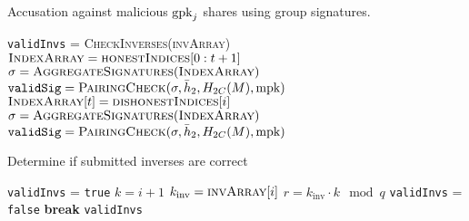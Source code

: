 \begin{algorithm}[p]
\caption{Accusation against malicious $\textrm{gpk}_{j}$ shares using
    group signatures.}
\label{alg:grpsig_malicious}
\begin{algorithmic}[1]
        \State \Return
    \EndIf
    \State \texttt{validInvs} = \textsc{CheckInverses}(\textsc{invArray})
        \State \Return
    \EndIf
    \State $\textsc{IndexArray} = \textsc{honestIndices}[0:t+1]$
    \State $\sigma = \textsc{AggregateSignatures}(\textsc{IndexArray})$
    \State $\texttt{validSig} = \textsc{PairingCheck}(\sigma, \bar{h}_{2},
        H_{2C}(M), \text{mpk})$
        \State \Return
    \EndIf
        \State $\textsc{IndexArray}[t]
            = \textsc{dishonestIndices}[i]$
        \State $\sigma = \textsc{AggregateSignatures}(\textsc{IndexArray})$
        \State $\texttt{validSig} = \textsc{PairingCheck}(\sigma, \bar{h}_{2},
            H_{2C}(M), \text{mpk})$
            \State \Return
        \EndIf
    \EndFor
\EndFunction
\end{algorithmic}
\end{algorithm}

\begin{algorithm}[p]
\caption{Determine if submitted inverses are correct}
\label{alg:grpsig_mal_Rj}
\begin{algorithmic}[1]
    \State \texttt{validInvs} = \texttt{true}
        \State $k = i+1$
        \State $k_{\text{inv}} = \textsc{invArray}[i]$
        \State $r = k_{\text{inv}}\cdot k \mod q$
            \State \texttt{validInvs} = \texttt{false}
            \State \textbf{break}
        \EndIf
    \EndFor
    \State \Return \texttt{validInvs}
\EndFunction
\end{algorithmic}
\end{algorithm}

